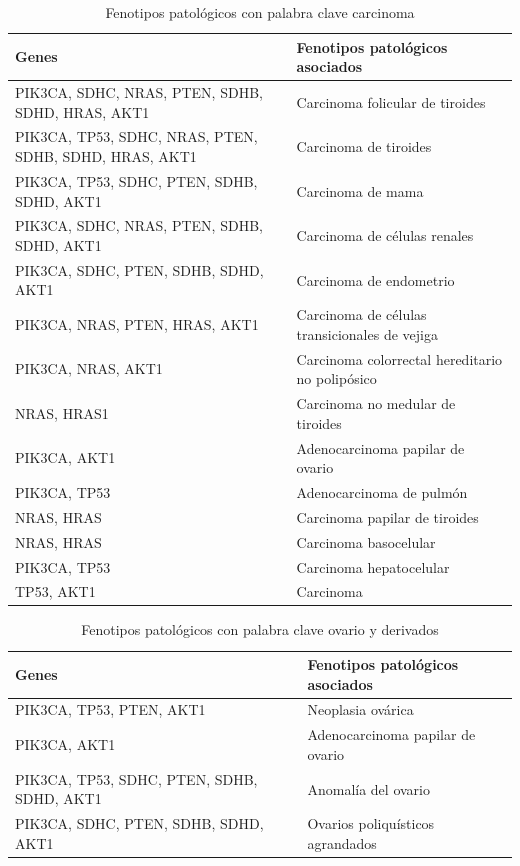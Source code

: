 \begin{table}[h]
	\centering
	\caption{Fenotipos patológicos con palabra clave carcinoma}
	\begin{tabular}{|p{6cm}|p{6cm}|}
		\hline
		\textbf{Genes} & \textbf{Fenotipos patológicos asociados} \\
		\hline
		PIK3CA, SDHC, NRAS, PTEN, SDHB, SDHD, HRAS, AKT1 & Carcinoma folicular de tiroides \\
		\hline
		PIK3CA, TP53, SDHC, NRAS, PTEN, SDHB, SDHD, HRAS, AKT1 & Carcinoma de tiroides \\
		\hline
		PIK3CA, TP53, SDHC, PTEN, SDHB, SDHD, AKT1 & Carcinoma de mama \\
		\hline
		PIK3CA, SDHC, NRAS, PTEN, SDHB, SDHD, AKT1 & Carcinoma de células renales \\
		\hline
		PIK3CA, SDHC, PTEN, SDHB, SDHD, AKT1 & Carcinoma de endometrio \\
		\hline
		PIK3CA, NRAS, PTEN, HRAS, AKT1 & Carcinoma de células transicionales de vejiga \\
		\hline
		PIK3CA, NRAS, AKT1 & Carcinoma colorrectal hereditario no polipósico \\
		\hline
		NRAS, HRAS1 & Carcinoma no medular de tiroides \\
		\hline
		PIK3CA, AKT1 & Adenocarcinoma papilar de ovario \\
		\hline
		PIK3CA, TP53 & Adenocarcinoma de pulmón \\
		\hline
		NRAS, HRAS & Carcinoma papilar de tiroides \\
		\hline
		NRAS, HRAS & Carcinoma basocelular \\
		\hline
		PIK3CA, TP53 & Carcinoma hepatocelular \\
		\hline
		TP53, AKT1 & Carcinoma \\
		\hline
	\end{tabular}
	\label{palabra-clave-carcinoma}
\end{table}

\begin{table}[h]
	\centering
	\caption{Fenotipos patológicos con palabra clave ovario y derivados}
	\begin{tabular}{|p{6cm}|p{6cm}|}
		\hline
		\textbf{Genes} & \textbf{Fenotipos patológicos asociados} \\
		\hline
		PIK3CA, TP53, PTEN, AKT1 & Neoplasia ovárica \\
		\hline
		PIK3CA, AKT1 & Adenocarcinoma papilar de ovario \\
		\hline
		PIK3CA, TP53, SDHC, PTEN, SDHB, SDHD, AKT1 & Anomalía del ovario \\
		\hline
		PIK3CA, SDHC, PTEN, SDHB, SDHD, AKT1 & Ovarios poliquísticos agrandados \\
		\hline
	\end{tabular}
	\label{palabra-clave-ovario}
\end{table}

